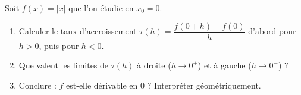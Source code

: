 \begin{exo}
Soit $f(x)=|x|$ que l'on étudie en $x_0=0$.
\begin{enumerate}[label=\alph*),leftmargin=7mm,itemsep=1pt]
  \item Calculer le taux d'accroissement $\tau(h)=\dfrac{f(0+h)-f(0)}{h}$
        d'abord pour $h>0$, puis pour $h<0$.
  \item Que valent les limites de $\tau(h)$ à droite ($h\to 0^+$) et à gauche
        ($h\to 0^-$) ?
  \item Conclure : $f$ est-elle dérivable en $0$ ? Interpréter géométriquement.
\end{enumerate}
\end{exo}


